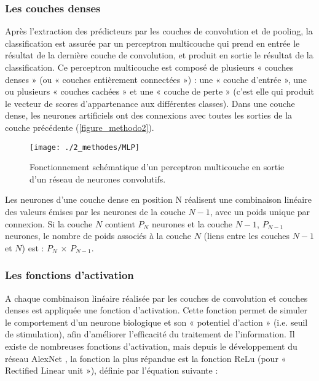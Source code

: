 \subsubsection{Les couches denses}

Après l’extraction des prédicteurs par les couches de convolution et de pooling, la classification est assurée par un perceptron multicouche qui prend en entrée le résultat de la dernière couche de convolution, et produit en sortie le résultat de la classification. Ce perceptron multicouche est composé de plusieurs « couches denses » (ou « couches entièrement connectées ») : une « couche d’entrée », une ou plusieurs « couches cachées » et une « couche de perte » (c’est elle qui produit le vecteur de scores d’appartenance aux différentes classes). Dans une couche dense, les neurones artificiels ont des connexions avec toutes les sorties de la couche précédente (\autoref{figure_methodo2}).

\begin{figure}[H]
	\begin{center}
	\texttt{[image: ./2\_methodes/MLP]}
		\caption[Fonctionnement schématique d’un perceptron multicouche en sortie d’un réseau de neurones convolutifs]{Fonctionnement schématique d’un perceptron multicouche en sortie d’un réseau de neurones convolutifs.}
	\label{figure_methodo2}
\end{center}
\end{figure}

Les neurones d’une couche dense en position N réalisent une combinaison linéaire des valeurs émises par les neurones de la couche $N-1$, avec un poids unique par connexion. Si la couche $N$ contient $P_N$ neurones et la couche $N-1$, $P_{N-1}$ neurones, le nombre de poids associés à la couche $N$ (liens entre les couches $N-1$ et $N$) est : $P_N$ $\times$ $P_{N-1}$.

\subsubsection{Les fonctions d'activation}

A chaque combinaison linéaire réalisée par les couches de convolution et couches denses est appliquée une fonction d’activation. Cette fonction permet de simuler le comportement d’un neurone biologique et son « potentiel d’action » (i.e. seuil de stimulation), afin d’améliorer l’efficacité du traitement de l’information. Il existe de nombreuses fonctions d’activation, mais depuis le développement du réseau AlexNet \citep{krizhevsky_imagenet_2012}, la fonction la plus répandue est la fonction ReLu (pour « Rectified Linear unit »), définie par l’équation suivante :

